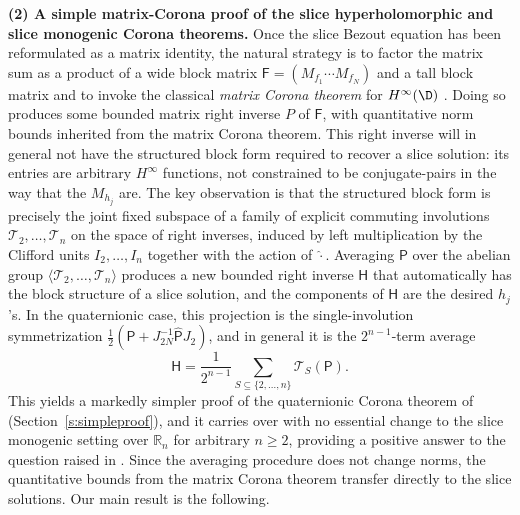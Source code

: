 \documentclass[11pt]{amsart}
\begin{document}
\medskip
\noindent\textbf{(2) A simple matrix-Corona proof of the slice hyperholomorphic and slice monogenic Corona theorems.}  Once the slice Bezout equation has been reformulated as a matrix identity, the natural strategy is to factor the matrix sum as a product of a wide block matrix $\mathsf{F}=(M_{f_1}\cdots M_{f_N})$ and a tall block matrix and to invoke the classical \emph{matrix Corona theorem} for $H^\infty(\D)$ \cites{MR0383098,MR0990193,MR0629839,MR0595742,MR2362422,MR2105955,MR2106344,MR2158178,MR2213732,MR2317961,MR1887635}.  Doing so produces some bounded matrix right inverse $P$ of $\mathsf{F}$, with quantitative norm bounds inherited from the matrix Corona theorem.  This right inverse will in general not have the structured block form required to recover a slice solution: its entries are arbitrary $H^\infty$ functions, not constrained to be conjugate-pairs in the way that the $M_{h_j}$ are.  The key observation is that the structured block form is precisely the joint fixed subspace of a family of explicit commuting involutions $\mathcal T_2,\ldots,\mathcal T_n$ on the space of right inverses, induced by left multiplication by the Clifford units $I_2,\ldots,I_n$ together with the action of $\hat\cdot$.  Averaging $\mathsf{P}$ over the abelian group $\langle \mathcal T_2,\ldots,\mathcal T_n\rangle$ produces a new bounded right inverse $\mathsf{H}$ that automatically has the block structure of a slice solution, and the components of $\mathsf{H}$ are the desired $h_j$'s.  In the quaternionic case, this projection is the single-involution symmetrization $\tfrac{1}{2}(\mathsf{P}+J_{2N}^{-1}\hat{\mathsf{P}} J_2)$, and in general it is the $2^{n-1}$-term average
\[
\mathsf{H}=\frac{1}{2^{n-1}}\sum_{S\subseteq\{2,\ldots,n\}}\mathcal T_S(\mathsf{P}).
\]
This yields a markedly simpler proof of the quaternionic Corona theorem of \cite{CPSW} (Section~\ref{s:simpleproof}), and it carries over with no essential change to the slice monogenic setting over $\mathbb{R}_n$ for arbitrary $n\ge 2$, providing a positive answer to the question raised in \cite{CPSW}.  Since the averaging procedure does not change norms, the quantitative bounds from the matrix Corona theorem transfer directly to the slice solutions.  Our main result is the following.
\end{document}
